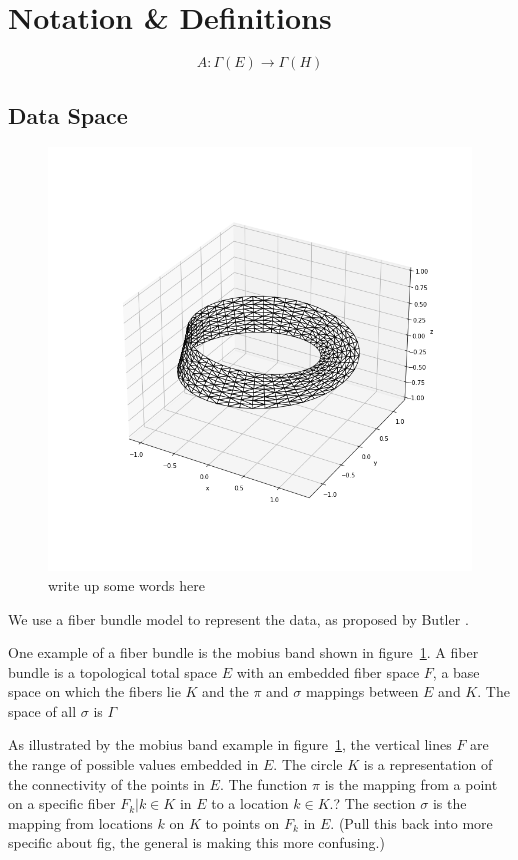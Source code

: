 \documentclass[../intro.tex]{subfiles}
\begin{document}
\section{Notation \& Definitions}

\begin{equation}
    A: \Gamma(E) \rightarrow \Gamma(H)
\end{equation}


 
\subsection{Data Space}
\begin{figure}[ht]
    \includegraphics[width=0.5\linewidth]{figures/sections/math/mobius.png}
    \caption{write up some words here}
    \label{fig:mobius}
\end{figure}

We use a fiber bundle model to represent the data, as proposed by Butler 
\cite{butlerVectorBundleClassesForm1992,butlerVisualizationModelBased1989}. 


One example of a fiber bundle is the mobius band shown in figure~\ref{fig:mobius}. A fiber bundle is a topological total space $E$ with an embedded fiber space $F$, a base space on which the fibers lie $K$ and the $\pi$ and $\sigma$ mappings between $E$ and $K$. The space of all $\sigma$ is $\Gamma$ 


As illustrated by the mobius band example in figure~\ref{fig:mobius}, the vertical lines $F$ are the range of possible values embedded in $E$. The circle $K$ is a representation of the connectivity of the points in $E$. The function $\pi$ is the mapping from a point on a specific fiber $F_{k}|k\in K$ in $E$ to a location $k \in K$.?  
The section $\sigma$ is the mapping from locations $k$ on $K$ to points on $F_{k}$ in $E$.  (Pull this back into more specific about fig, the general is making this more confusing.)
\end{document}
